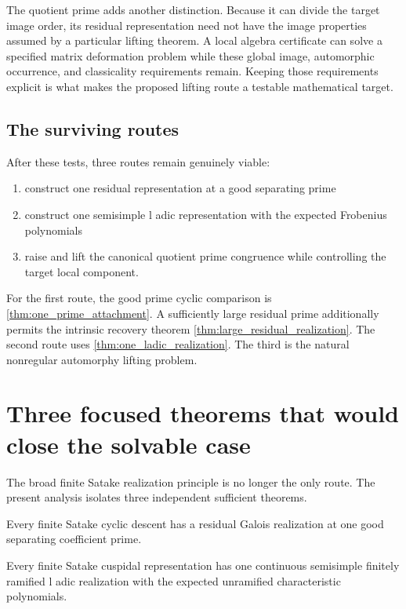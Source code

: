 The quotient prime adds another distinction. Because it can divide the target image order, its residual representation need not have the image properties assumed by a particular lifting theorem. A local algebra certificate can solve a specified matrix deformation problem while these global image, automorphic occurrence, and classicality requirements remain. Keeping those requirements explicit is what makes the proposed lifting route a testable mathematical target.

\subsection{The surviving routes}

After these tests, three routes remain genuinely viable:

\begin{enumerate}
\item construct one residual representation at a good separating prime
\item construct one semisimple l adic representation with the expected Frobenius polynomials
\item raise and lift the canonical quotient prime congruence while controlling the target local component.
\end{enumerate}

For the first route, the good prime cyclic comparison is \cref{thm:one_prime_attachment}. A sufficiently large residual prime additionally permits the intrinsic recovery theorem \cref{thm:large_residual_realization}. The second route uses \cref{thm:one_ladic_realization}. The third is the natural nonregular automorphy lifting problem.

\section{Three focused theorems that would close the solvable case}\label{sec:focused_conjecture}

The broad finite Satake realization principle is no longer the only route. The present analysis isolates three independent sufficient theorems.

\begin{definition}\label{def:SRRP}
Every finite Satake cyclic descent has a residual Galois realization at one good separating coefficient prime.
\end{definition}

\begin{definition}\label{def:FSLR}
Every finite Satake cuspidal representation has one continuous semisimple finitely ramified l adic realization with the expected unramified characteristic polynomials.
\end{definition}

